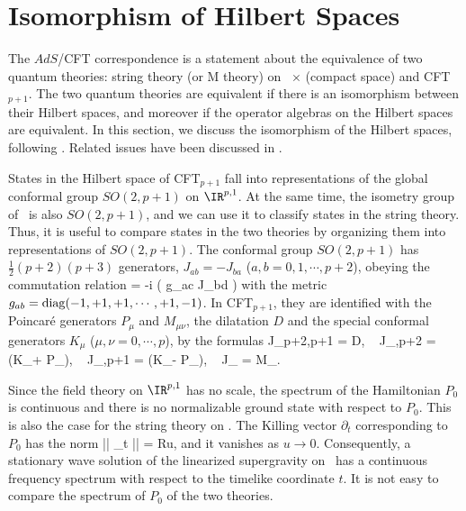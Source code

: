 
\section{Isomorphism of Hilbert Spaces} 
\label{isom}

The $AdS$/CFT correspondence is a statement about
the equivalence of two quantum theories: string
theory (or M theory) on \adsp\ $\times$ (compact space)
and CFT$_{p+1}$. The two quantum theories
are equivalent if there is an isomorphism
between their Hilbert spaces, and moreover
if the operator algebras on the Hilbert spaces
are equivalent. In this section, we
discuss the isomorphism of the Hilbert spaces,
following \cite{Horowitz:1998bj,Witten:1998zw,
Maldacena:1998bw,Banks:1998dd}.
Related issues have been discussed 
in \cite{Barbon:1998ix,Barbon:1998cr,Abel:1999rq,
Chamblin:1999pz,Li:1999jy,Peet:1998cr,
Martinec:1998wm,Martinec:1999ja,
Martinec:1999sa}.

States in the Hilbert space of CFT$_{p+1}$
fall into representations of the global conformal
group $SO(2,p+1)$ on $\IR^{p,1}$. At the same time,
the isometry group of \ads\ is also $SO(2,p+1)$, and 
we can use it to classify states in 
the string theory. Thus, it is useful to compare
states in the two theories by organizing them into
representations of $SO(2,p+1)$. 
The conformal group $SO(2,p+1)$ has $\frac{1}{2}(p+2)(p+3)$
generators, $J_{ab} = -J_{ba}$ ($a,b = 0,1, \cdots, p+2$),
obeying the commutation relation
\beq
   [J_{ab}, J_{cd}] = -i ( g_{ac} J_{bd} )
\label{commutations} 
\eeq
with the metric $g_{ab}={\rm diag} (-1,+1,+1, \cdots, +1, -1)$.
In CFT$_{p+1}$, they are identified with
 the Poincar\'e generators $P_\mu$ and $M_{\mu\nu}$,
the dilatation $D$ and the special conformal generators $K_\mu$
($\mu, \nu = 0, \cdots, p$), by the formulas
\beq
   J_{p+2,p+1} = D, ~ J_{\mu,p+2} = (K_\mu + P_\mu),
~ J_{\mu,p+1} = (K_\mu - P_\mu), ~ J_{\mu\nu} = M_{\mu\nu}.
\eeq

Since the field theory on $\IR^{p,1}$ has no scale,  
the spectrum of the Hamiltonian $P_0$ is
continuous and there is no normalizable
ground state with respect to $P_0$. 
This is also the case for the string theory on 
\adsp. The Killing vector $\partial_t$
corresponding to $P_0$ has the norm
\beq
   || \partial_t || = Ru,
\eeq
and it vanishes as $u \rightarrow 0$. Consequently,
a stationary wave solution of the linearized supergravity
on \ads\ has a continuous frequency spectrum with respect to 
the timelike coordinate $t$. It is not easy to compare the
spectrum of $P_0$ of the two theories.

